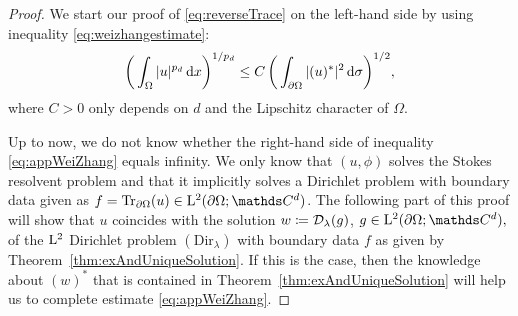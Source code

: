 \begin{proof}
  We start our proof of \eqref{eq:reverseTrace} on the left-hand side by using inequality \eqref{eq:weizhangestimate}:
  \begin{align}
    \label{eq:appWeiZhang}
    \bigg( \int_\Omega |u|^{p_d} \, {\operatorname{d}\!{x}} \bigg)^{1/{p_d}} \leq C\, \bigg( \int_{\partial\Omega} |(u)^*|^2 \, {\operatorname{d}\!{\sigma}} \bigg)^{1/2},
  \end{align}
  where $C>0$ only depends on $d$ and the Lipschitz character of $\Omega$.

  Up to now, we do not know whether the right-hand side of inequality \eqref{eq:appWeiZhang} equals infinity.
  We only know that $(u,\phi)$ solves the Stokes resolvent problem and that it implicitly solves a Dirichlet problem with boundary data given as $f = \operatorname{Tr}_{\partial\Omega} (u) \in \Ell^2(\partial\Omega; \C^d)$.
  The following part of this proof will show that $u$ coincides with the solution $w \coloneqq \mathcal{D}_\lambda(g)$, $g \in \Ell^2(\partial\Omega; \C^d),$  of the $\mathrm{L}^2$ Dirichlet problem \hyperref[eq:dirProblem]{$(\mathrm{Dir}_\lambda)$} with boundary data $f$ as given by Theorem~\ref{thm:exAndUniqueSolution}. 
  If this is the case, then the knowledge about $(w)^*$ that is contained in Theorem~\ref{thm:exAndUniqueSolution} will help us to complete estimate \eqref{eq:appWeiZhang}.


\end{proof}
